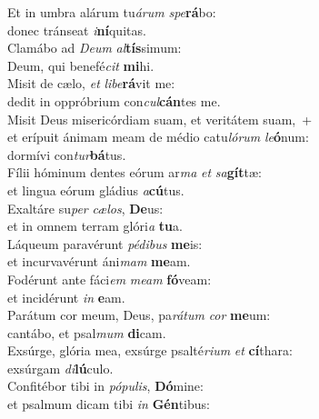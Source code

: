 \evenverse Et in umbra alárum tu\textit{á}\textit{rum} \textit{spe}\textbf{rá}bo:~\*\\
\evenverse donec tránseat \textit{i}\textbf{ní}quitas.\\
\oddverse Clamábo ad \textit{De}\textit{um} \textit{al}\textbf{tís}simum:~\*\\
\oddverse Deum, qui benefé\textit{cit} \textbf{mi}hi.\\
\evenverse Misit de cælo, \textit{et} \textit{li}\textit{be}\textbf{rá}vit me:~\*\\
\evenverse dedit in oppróbrium con\textit{cul}\textbf{cán}tes me.\\
\oddverse Misit Deus misericórdiam suam, et veritátem suam,~+\\
\oddverse  et erípuit ánimam meam de médio catu\textit{ló}\textit{rum} \textit{le}\textbf{ó}num:~\*\\
\oddverse dormívi con\textit{tur}\textbf{bá}tus.\\
\evenverse Fílii hóminum dentes eórum ar\textit{ma} \textit{et} \textit{sa}\textbf{gít}tæ:~\*\\
\evenverse et lingua eórum gládius \textit{a}\textbf{cú}tus.\\
\oddverse Exaltáre su\textit{per} \textit{cæ}\textit{los}, \textbf{De}us:~\*\\
\oddverse et in omnem terram glóri\textit{a} \textbf{tu}a.\\
\evenverse Láqueum paravérunt \textit{pé}\textit{di}\textit{bus} \textbf{me}is:~\*\\
\evenverse et incurvavérunt áni\textit{mam} \textbf{me}am.\\
\oddverse Fodérunt ante fáci\textit{em} \textit{me}\textit{am} \textbf{fó}veam:~\*\\
\oddverse et incidérunt \textit{in} \textbf{e}am.\\
\evenverse Parátum cor meum, Deus, pa\textit{rá}\textit{tum} \textit{cor} \textbf{me}um:~\*\\
\evenverse cantábo, et psal\textit{mum} \textbf{di}cam.\\
\oddverse Exsúrge, glória mea, exsúrge psalté\textit{ri}\textit{um} \textit{et} \textbf{cí}thara:~\*\\
\oddverse exsúrgam \textit{di}\textbf{lú}culo.\\
\evenverse Confitébor tibi in \textit{pó}\textit{pu}\textit{lis}, \textbf{Dó}mine:~\*\\
\evenverse et psalmum dicam tibi \textit{in} \textbf{Gén}tibus:\\
